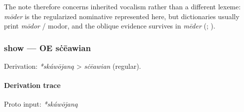 \documentclass[
  british,
  a4paper,
]{article}
\begin{document}
The note therefore concerns inherited vocalism rather than a different
lexeme: \emph{mōder} is the regularized nominative represented here, but
dictionaries usually print \emph{mōdor} / modor, and the oblique
evidence survives in \emph{mēder} (; ).

\subsubsection{show --- OE sċēawian}\label{show-oe-sux10bux113awian-2}

Derivation: \emph{*skáwōjaną} \textgreater{} \emph{sċēawian} (regular).

\paragraph{Derivation trace}\label{derivation-trace-34}

Proto input: \emph{*skáwōjaną}

\begingroup
\setlength{\fboxsep}{6pt}
\end{document}
